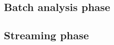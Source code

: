 \subsection{Batch analysis phase}


                    
\subsection{Streaming phase}

            

